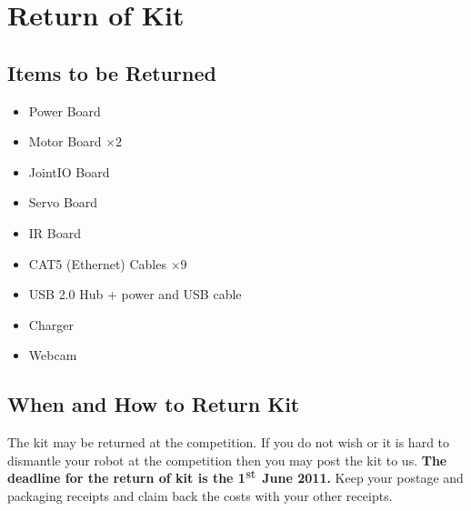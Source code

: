 \section {Return of Kit}
\label{sec:kit-return}

\subsection {Items to be Returned}

\begin{itemize}
\item Power Board
\item Motor Board $\times 2$
\item JointIO Board
\item Servo Board
\item IR Board
\item CAT5 (Ethernet) Cables $\times 9$
\item USB 2.0 Hub + power and USB cable
\item Charger
\item Webcam
\end{itemize}

\subsection {When and How to Return Kit}

The kit may be returned at the competition. If you do not wish or it is hard
to dismantle your robot at the competition then you may post the kit to us.
\textbf{The deadline for the return of kit is the 1$^{\hbox{st}}$ June 2011.}
Keep your postage and packaging receipts and claim back the costs with your
other receipts.
